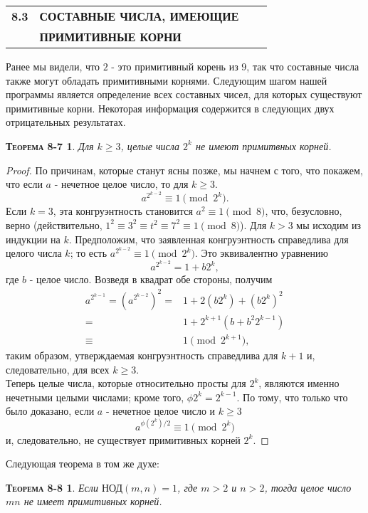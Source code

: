 \documentclass[11pt]{article}
\newtheorem*{theorem_1}{\textsc{Теорема 8-7}}
\newtheorem*{theorem_2}{\textsc{Теорема 8-8}}
\begin{document}
\newpage
{}

\begin{tabular}{llll}
\textbf{8.3} \quad & \textbf{СОСТАВНЫЕ ЧИСЛА, ИМЕЮЩИЕ} \\ & \textbf{ПРИМИТИВНЫЕ КОРНИ}
\end{tabular}

Ранее мы видели, что $2$ - это примитивный корень из $9$, так что составные числа также могут обладать примитивными корнями. Следующим шагом нашей программы является определение всех составных чисел, для которых существуют примитивные корни. Некоторая информация содержится в следующих двух отрицательных результатах. \\
\begin{theorem_1}\label{t1}
\textsl{Для $k \geq 3$, целые числа $2^k$ не имеют примитвных корней.}
\end{theorem_1}
\begin{proof}
По причинам, которые станут ясны позже, мы начнем с того, что покажем, что если $a$ - нечетное целое число, то для $k \geq 3$.
\begin{equation*}
    a^{2^{k-2}} \equiv 1 \pmod{2^{k}}.
\end{equation*}
Если $k = 3$, эта конгруэнтность становится $a^2 \equiv 1 \pmod{8}$, что, безусловно, верно (действительно, $1^2 \equiv 3^2 \equiv t^2 \equiv 7^2 \equiv 1 \pmod{8}$). Для $k > 3$ мы исходим из индукции на $k$. Предположим, что заявленная конгруэнтность справедлива для целого числа $k$; то есть $a^{2^{k-2}} \equiv 1 \pmod{2^k}$. Это эквивалентно уравнению \\
\begin{equation*}
    a^{2^{k-2}} = 1 + b2^{k},
\end{equation*}
где $b$ - целое число. Возведя в квадрат обе стороны, получим
\begin{align*}
    a^{2^{k-1}} = (a^{2^{k-2}})^2 =& 1 + 2(b2^k) + (b2^k)^2 \\ =& 1 + 2^{k+1}(b+b^{2}2^{k-1}) \\ \equiv& 1 \pmod{2^{k+1}},
\end{align*}
таким образом, утверждаемая конгруэнтность справедлива для $k + 1$ и, следовательно, для всех $k \geq 3$. \\
Теперь целые числа, которые относительно просты для $2^k$, являются именно нечетными целыми числами; кроме того, $\phi{2^{k}} = 2^{k-1}$. По тому, что только что было доказано, если $a$ - нечетное целое число и $k \geq 3$
\begin{equation*}
    a^{\phi(2^{k})/2} \equiv 1 \pmod{2^k}
\end{equation*}
и, следовательно, не существует примитивных корней $2^k$.
\end{proof}
Следующая теорема в том же духе:
\begin{theorem_2}\label{t2}
\textsl{Если $\text{НОД}(m,n)=1$, где $m>2$ и $n>2$, тогда целое число $mn$ не имеет примитивных корней.}
\end{theorem_2}
\end{document}
